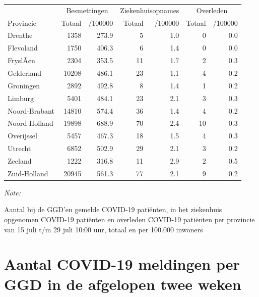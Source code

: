 \documentclass[
  english,
  man,floatsintext]{apa6}
\begin{document}
\begin{table}
\centering
\begin{threeparttable}
\begin{tabular}{lrrrrrr}
\toprule
\multicolumn{1}{c}{ } & \multicolumn{2}{c}{Besmettingen} & \multicolumn{2}{c}{Ziekenhuisopnames} & \multicolumn{2}{c}{Overleden} \\
\cmidrule(l{3pt}r{3pt}){2-3} \cmidrule(l{3pt}r{3pt}){4-5} \cmidrule(l{3pt}r{3pt}){6-7}
Provincie & Totaal & /100000 & Totaal & /100000 & Totaal & /100000\\
\midrule
Drenthe & 1358 & 273.9 & 5 & 1.0 & 0 & 0.0\\
Flevoland & 1750 & 406.3 & 6 & 1.4 & 0 & 0.0\\
FryslÃ¢n & 2304 & 353.5 & 11 & 1.7 & 2 & 0.3\\
Gelderland & 10208 & 486.1 & 23 & 1.1 & 4 & 0.2\\
Groningen & 2892 & 492.8 & 8 & 1.4 & 1 & 0.2\\
Limburg & 5401 & 484.1 & 23 & 2.1 & 3 & 0.3\\
Noord-Brabant & 14810 & 574.4 & 36 & 1.4 & 4 & 0.2\\
Noord-Holland & 19898 & 688.9 & 70 & 2.4 & 10 & 0.3\\
Overijssel & 5457 & 467.3 & 18 & 1.5 & 4 & 0.3\\
Utrecht & 6852 & 502.9 & 29 & 2.1 & 3 & 0.2\\
Zeeland & 1222 & 316.8 & 11 & 2.9 & 2 & 0.5\\
Zuid-Holland & 20945 & 561.3 & 77 & 2.1 & 9 & 0.2\\
\bottomrule
\end{tabular}
\begin{tablenotes}
\item \textit{Note: } 
\item Aantal bij de GGD’en gemelde COVID-19 patiënten, in het ziekenhuis opgenomen COVID-19 patiënten en overleden COVID-19 patiënten per provincie van 15 juli t/m 29 juli 10:00 uur, totaal en per 100.000 inwoners
\end{tablenotes}
\end{threeparttable}
\end{table}

\newpage

\hypertarget{aantal-covid-19-meldingen-per-ggd-in-de-afgelopen-twee-weken}{%
\section{Aantal COVID-19 meldingen per GGD in de afgelopen twee weken}\label{aantal-covid-19-meldingen-per-ggd-in-de-afgelopen-twee-weken}}
\end{document}
